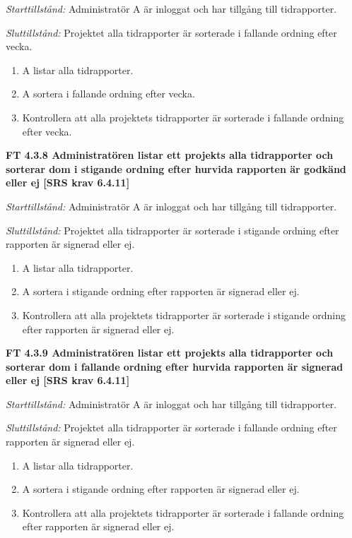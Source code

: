 \documentclass[a4paper]{article}
\begin{document}
\emph{Starttillstånd:} Administratör A är inloggat och har tillgång till tidrapporter.

\emph{Sluttillstånd:} Projektet alla tidrapporter är sorterade i fallande ordning efter vecka.

\begin{enumerate}
\item A listar alla tidrapporter.
\item A sortera i fallande ordning efter vecka.
\item Kontrollera att alla projektets tidrapporter är sorterade i fallande ordning efter vecka.
\end{enumerate}

\textbf{FT 4.3.8 Administratören listar ett projekts alla tidrapporter och sorterar dom i stigande ordning efter hurvida rapporten är godkänd eller ej [SRS krav 6.4.11]}

\emph{Starttillstånd:} Administratör A är inloggat och har tillgång till tidrapporter.

\emph{Sluttillstånd:} Projektet alla tidrapporter är sorterade i stigande ordning efter rapporten är signerad eller ej.

\begin{enumerate}
\item A listar alla tidrapporter.
\item A sortera i stigande ordning efter rapporten är signerad eller ej.
\item Kontrollera att alla projektets tidrapporter är sorterade i stigande ordning efter rapporten är signerad eller ej.
\end{enumerate}

\textbf{FT 4.3.9 Administratören listar ett projekts alla tidrapporter och sorterar dom i fallande ordning efter hurvida rapporten är signerad eller ej [SRS krav 6.4.11]}

\emph{Starttillstånd:} Administratör A är inloggat och har tillgång till tidrapporter.

\emph{Sluttillstånd:} Projektet alla tidrapporter är sorterade i fallande ordning efter rapporten är signerad eller ej.

\begin{enumerate}
\item A listar alla tidrapporter.
\item A sortera i stigande ordning efter rapporten är signerad eller ej.
\item Kontrollera att alla projektets tidrapporter är sorterade i fallande ordning efter rapporten är signerad eller ej.
\end{enumerate}
\end{document}
